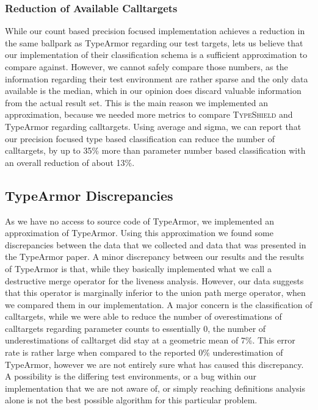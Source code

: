 \subsubsection{Reduction of Available Calltargets}
While our count based precision focused implementation achieves a reduction in the same ballpark as
TypeArmor regarding our test targets, lets us believe that our implementation of their classification
schema is a sufficient approximation to compare against. However, we cannot safely compare those numbers,
as the information regarding their test environment are rather sparse and the only data available is the
median, which in our opinion does discard valuable information from the actual result set. This is the
main reason we implemented an approximation, because we needed more metrics to compare \textsc{TypeShield}
and TypeArmor regarding calltargets. Using average and sigma, we can report that our precision focused
type based classification can reduce the number of calltargets, by up to 35\% more than parameter number
based classification with an overall reduction of about 13\%.

\subsection{TypeArmor Discrepancies}
\label{section:discrep}
As we have no access to source code of TypeArmor, we implemented an approximation
of TypeArmor. Using this approximation we found some discrepancies between the data that we collected
and data that was presented in the TypeArmor paper.
A minor discrepancy between our results and the results of TypeArmor is that, while they basically implemented
what we call a destructive merge operator for the liveness analysis. However, our data suggests that this
operator is marginally inferior to the union path merge operator, when we compared them in our implementation.
A major concern is the classification of calltargets, while we were able to reduce the number of overestimations
of calltargets regarding parameter counts to essentially 0, the number of underestimations of calltarget did
stay at a geometric mean of 7\%. This error rate is rather large when compared to the reported 0\% underestimation
of TypeArmor, however we are not entirely sure what has caused this discrepancy. A possibility is the differing
test environments, or a bug within our implementation that we are not aware of, or simply reaching definitions
analysis alone is not the best possible algorithm for this particular problem.


